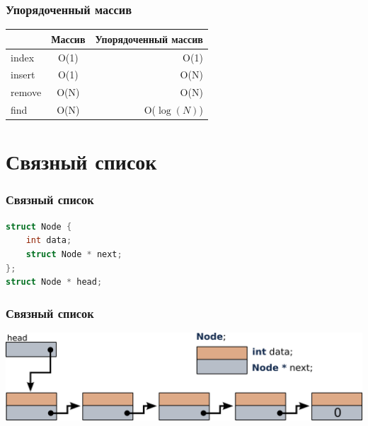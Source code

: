 \documentclass[12pt,pdf,hyperref={unicode}]{beamer}
\begin{document}
\begin{frame}[fragile]
\frametitle{Упорядоченный массив}
\begin{center}
  \begin{tabular}{  l | c r }
      & Массив & Упорядоченный массив \\
    \hline
    index & O(1) & O(1)\\
    insert & O(1) & O(N)\\
    remove & O(N) & O(N)\\
    find & O(N) & O($\log(N)$)\\
    \hline
  \end{tabular}
\end{center}
\end{frame}


\section{Связный список}

\begin{frame}[fragile]
\frametitle{Связный список} 
\begin{lstlisting}[language=C++,basicstyle=\ttfamily,keywordstyle=\color{blue},stringstyle=\color{orange}\ttfamily]
struct Node {
	int data;
	struct Node * next;
};
struct Node * head;
\end{lstlisting}
\end{frame}




\begin{frame}[fragile]
\frametitle{Связный список} 
\begin{center}
\includegraphics[width=0.99\linewidth]{images/list_initial.png}
\end{center}
\end{frame}
\end{document}
